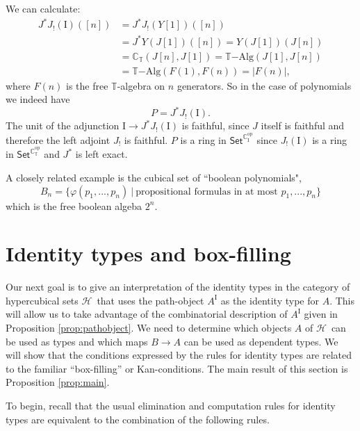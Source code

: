 \documentclass[11pt]{article}
\newcommand{\C}{\ensuremath{\mathbb{C}}}
\newcommand{\T}{\ensuremath{\mathbb{T}}}
\newcommand{\psh}[1]{\ensuremath{\mathsf{Set}^{#1^{\mathrm{op}}}}}
\newcommand{\I}{\ensuremath{\mathrm{I}}}
\newcommand{\HH}{\ensuremath{\mathcal{H}}}
\theoremstyle{remark}
\theoremstyle{definition}
\begin{document}
We can calculate:
\begin{equation}
\begin{split}
J^* J_! ( \I )( [n] ) &= J^* J_! ( Y[1] )( [n] )\\
 &= J^* Y( J[1] )( [n] ) = Y( J[1] )( J[n] ) \\
 &= \C_\T( J[n] , J[1] ) = \T\mathrm{-Alg}( J[1] , J[n] ) \\
 &= \T\mathrm{-Alg}( F(1) , F(n) ) = | F(n) |,
\end{split}
\end{equation}
where $F(n)$ is the free $\T$-algebra on $n$ generators.  So in the case of polynomials we indeed have 
$$P = J^* J_! ( \I ).$$
The unit of the adjunction $\I \to J^* J_! ( \I )$ is faithful, since $J$ itself is faithful and therefore the left adjoint $J_!$ is faithful.
$P$ is a ring in $\psh{\C_\I}$ since $J_!(\I)$ is a ring in $\psh{\C_\T}$ and $J^*$ is left exact.

A closely related example is the cubical set of ``boolean polynomials",
\[
B_n = \{ \varphi(p_1, ..., p_n)\ |\ \text{propositional formulas in at most $p_1, ..., p_n$} \}
\]
which is the free boolean algeba $2^n$.  

\section{Identity types and box-filling}

Our next goal is to give an interpretation of the identity types in the category of hypercubical sets \HH\ that uses the path-object $A^\I$ as the identity type for $A$.  This will allow us to take advantage of the  combinatorial description of $A^\I$ given in Proposition \ref{prop:pathobject}.  We need to determine which objects $A$ of \HH\ can be used as types and which maps $B\to A$ can be used as dependent types.  We will show that the conditions expressed by the rules for identity types are related to the familiar ``box-filling'' or Kan-conditions.  The main result of this section is Proposition \ref{prop:main}.

To begin, recall that the usual elimination and computation rules for identity types are equivalent to the combination of the following rules.
\end{document}
